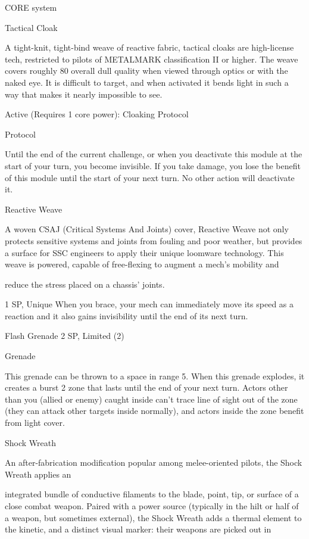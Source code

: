                                                  CORE system

                                                 Tactical Cloak

 A tight-knit, tight-bind weave of reactive fabric, tactical cloaks are high-license tech, restricted to pilots
  of METALMARK classification II or higher. The weave covers roughly 80%
  overall dull quality when viewed through optics or with the naked eye. It is difficult to target, and when
 activated it bends light in such a way that makes it nearly impossible to see.

 Active (Requires 1 core power):
  Cloaking Protocol

  Protocol

  Until the end of the current challenge, or when you deactivate this module at the start of your turn, you
  become invisible. If you take damage, you lose the benefit of this module until the start of your next
  turn. No other action will deactivate it.

Reactive Weave

A woven CSAJ (Critical Systems And Joints) cover, Reactive Weave not only protects sensitive systems and
joints from fouling and poor weather, but provides a surface for SSC engineers to apply their unique
loomware technology. This weave is powered, capable of free-flexing to augment a mech’s mobility and

reduce the stress placed on a chassis’ joints.




1 SP, Unique
When you brace, your mech can immediately move its speed as a reaction and it also gains
invisibility until the end of its next turn.


Flash Grenade
2 SP, Limited (2)

Grenade


This grenade can be thrown to a space in range 5. When this grenade explodes, it creates a
burst 2 zone that lasts until the end of your next turn. Actors other than you (allied or enemy)
caught inside can’t trace line of sight out of the zone (they can attack other targets inside
normally), and actors inside the zone benefit from light cover.


Shock Wreath

An after-fabrication modification popular among melee-oriented pilots, the Shock Wreath applies an

integrated bundle of conductive filaments to the blade, point, tip, or surface of a close combat weapon.
Paired with a power source (typically in the hilt or half of a weapon, but sometimes external), the Shock
Wreath adds a thermal element to the kinetic, and a distinct visual marker: their weapons are picked out in

